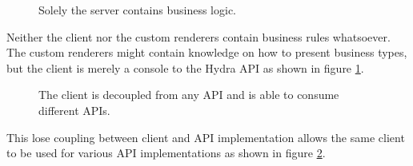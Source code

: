 \begin{figure}[!htb]
  \caption{Solely the server contains business logic.}
  \label{fig:businesslogic}
\end{figure}

Neither the client nor the custom renderers contain business rules whatsoever. The custom renderers might contain knowledge on how to present business types, but the client is merely a console to the Hydra API as shown in figure \ref{fig:businesslogic}.

\begin{figure}[!htb]
  \caption{The client is decoupled from any API and is able to consume different APIs.}
  \label{fig:losecoupling}
\end{figure}

This lose coupling between client and API implementation allows the same client to be used for various API implementations as shown in figure \ref{fig:losecoupling}.

